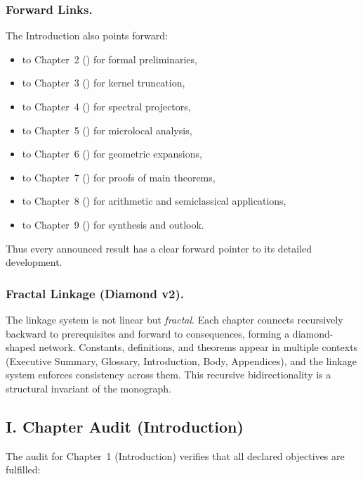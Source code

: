 \subsubsection*{Forward Links.}
The Introduction also points forward:
\begin{itemize}
  \item to Chapter~2 () for formal preliminaries,
  \item to Chapter~3 () for kernel truncation,
  \item to Chapter~4 () for spectral projectors,
  \item to Chapter~5 () for microlocal analysis,
  \item to Chapter~6 () for geometric expansions,
  \item to Chapter~7 () for proofs of main theorems,
  \item to Chapter~8 () for arithmetic and semiclassical applications,
  \item to Chapter~9 () for synthesis and outlook.
\end{itemize}
Thus every announced result has a clear forward pointer to its detailed development.

\subsubsection*{Fractal Linkage (Diamond v2).}
The linkage system is not linear but \emph{fractal}.
Each chapter connects recursively backward to prerequisites
and forward to consequences, forming a diamond-shaped network.
Constants, definitions, and theorems appear in multiple contexts
(Executive Summary, Glossary, Introduction, Body, Appendices),
and the linkage system enforces consistency across them.
This recursive bidirectionality is a structural invariant of the monograph.

\subsection*{I. Chapter Audit (Introduction)}

The audit for Chapter~1 (Introduction) verifies that all declared objectives are fulfilled:

